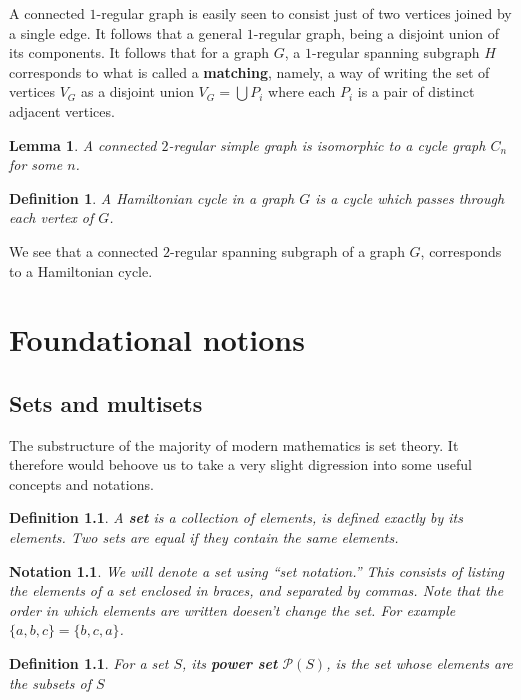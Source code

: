 \documentclass[12pt]{report}
\theoremstyle{plain}
\newtheorem{defn}[thm]{Definition}
\newtheorem{notn}[thm]{Notation}
\newtheorem{lem}[thm]{Lemma}
\newcommand{\ms}[1]{\mathscr #1}
\newcommand{\Xb}[1]{\textbf{#1}\index{#1}}
\begin{document}
A connected $1$-regular graph is easily seen to consist just of two
vertices joined by a single edge. It follows that a general $1$-regular
graph, being a disjoint union of its components. It follows that for a
graph $G$, a $1$-regular spanning subgraph $H$ corresponds to what is
called a \Xb{matching}, namely, a way of writing the set of vertices $V_G$
as a disjoint union $V_G = \bigcup P_i$ where each $P_i$ is a pair of
distinct adjacent vertices. 

\begin{lem}
A connected $2$-regular simple graph is isomorphic to a cycle graph $C_n$
for some $n$.
\end{lem}

\begin{defn}
A Hamiltonian cycle in a graph $G$ is a cycle which passes through each
vertex of $G$.
\end{defn}

We see that a connected $2$-regular spanning subgraph of a graph $G$,
corresponds to a Hamiltonian cycle. 

\appendix

\chapter{Foundational notions}

\section{Sets and multisets}

The substructure of the majority of modern mathematics is set theory. It
therefore would behoove us to take a very slight digression into some
useful concepts and notations.

\begin{defn}
A \Xb{set} is a collection of elements, is defined exactly by its elements.
Two sets are equal if they contain the same elements.
\end{defn}

\begin{notn}
We will denote a set using ``set notation.'' This consists of listing the
elements of a set enclosed in braces, and separated by commas. Note that
the order in which elements are written doesen't change the set. For
example $\{a, b, c\} = \{b, c, a\}$.
\end{notn}

\begin{defn}
For a set $S$, its \Xb{power set} $\ms P(S)$, is the set whose
elements are the subsets of $S$
\end{defn}
\end{document}
